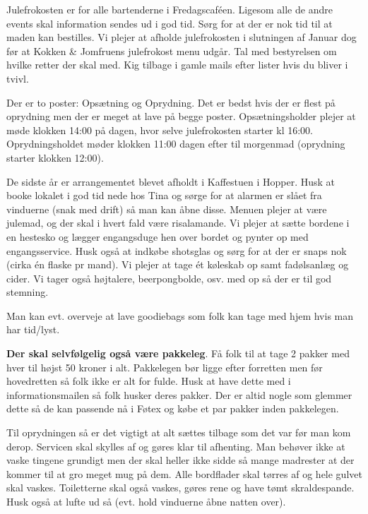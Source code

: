 Julefrokosten er for alle bartenderne i Fredagscaféen. Ligesom alle de andre events skal information sendes ud i god tid. Sørg for at der er nok tid til at maden kan bestilles. Vi plejer at afholde julefrokosten i slutningen af Januar dog før at Kokken \& Jomfruens julefrokost menu udgår. Tal med bestyrelsen om hvilke retter der skal med. Kig tilbage i gamle mails efter lister hvis du bliver i tvivl.

Der er to poster: Opsætning og Oprydning. Det er bedst hvis der er flest på oprydning men der er meget at lave på begge poster. Opsætningsholder plejer at møde klokken 14:00 på dagen, hvor selve julefrokosten starter kl 16:00. Oprydningsholdet møder klokken 11:00 dagen efter til morgenmad (oprydning starter klokken 12:00).

De sidste år er arrangementet blevet afholdt i Kaffestuen i Hopper. Husk at booke lokalet i god tid nede hos Tina og sørge for at alarmen er slået fra vinduerne (snak med drift) så man kan åbne disse. Menuen plejer at være julemad, og der skal i hvert fald være risalamande. Vi plejer at sætte bordene i en hestesko og lægger engangsduge hen over bordet og pynter op med engangsservice. Husk også at indkøbe shotsglas og sørg for at der er snaps nok (cirka én flaske pr mand). Vi plejer at tage ét køleskab op samt fadølsanlæg og cider. Vi tager også højtalere, beerpongbolde, osv. med op så der er til god stemning.

Man kan evt. overveje at lave goodiebags som folk kan tage med hjem hvis man har tid/lyst.

\textbf{Der skal selvfølgelig også være pakkeleg}. Få folk til at tage 2 pakker med hver til højst 50 kroner i alt. Pakkelegen bør ligge efter forretten men før hovedretten så folk ikke er alt for fulde. Husk at have dette med i informationsmailen så folk husker deres pakker. Der er altid nogle som glemmer dette så de kan passende nå i Føtex og købe et par pakker inden pakkelegen.

Til oprydningen så er det vigtigt at alt sættes tilbage som det var før man kom derop. Servicen skal skylles af og gøres klar til afhenting. Man behøver ikke at vaske tingene grundigt men der skal heller ikke sidde så mange madrester at der kommer til at gro meget mug på dem. Alle bordflader skal tørres af og hele gulvet skal vaskes. Toiletterne skal også vaskes, gøres rene og have tømt skraldespande. Husk også at lufte ud så (evt. hold vinduerne åbne natten over).
 
\\ \\


